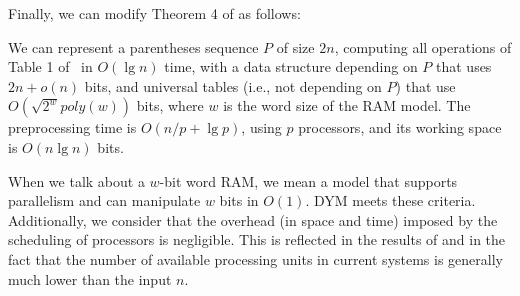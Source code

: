 Finally, we can modify Theorem 4 of
\cite{Navarro:2014:FFS:2620785.2601073} as follows:

\begin{theorem}
  We can represent a parentheses sequence $P$ of size $2n$, computing all
  operations of Table 1 of~\cite{Navarro:2014:FFS:2620785.2601073}
  in $O(\lg n)$ time, with a data
  structure depending on $P$ that uses $2n+o(n)$ bits, and universal
  tables (i.e., not depending on $P$) that use $O(\sqrt{2^{w}}poly(w))$
  bits, where $w$ is the word size of the RAM model. The preprocessing
  time is $O(n/p + \lg p)$, using $p$
  processors, and its working space is $O(n\lg n)$ bits.
\end{theorem}
			
When we talk about a $w$-bit word RAM, we mean a model that supports
parallelism and can manipulate $w$ bits in $O(1)$. DYM meets these
criteria. Additionally, we consider that the overhead (in space and
time) imposed by the scheduling of processors is negligible. This is
reflected in the results of \cite{Blumofe:1999:SMC:324133.324234} and in the fact that the number of available processing units in current systems is generally much lower than the input $n$.